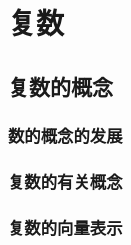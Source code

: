 \chapter{复数}
\section{复数的概念}
\subsection{数的概念的发展}
\subsection{复数的有关概念}
\begin{Practice}
  \begin{question}
    \item 
    \item 
    \item 
    \item 
    \item 
    \item 
    \item 
    \item 
    \item 
    \item 
  \end{question}
\end{Practice}

\subsection{复数的向量表示}
\begin{Practice}
  \begin{question}
    \item 
    \item 
  \end{question}
\end{Practice}

\begin{Exercise}
  \begin{question}
    \item 
    \item 
    \item 
    \item 
    \item 
    \item 
    \item 
    \item 
    \item 
    \item 
  \end{question}
\end{Exercise}

